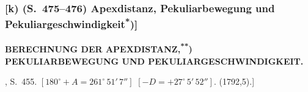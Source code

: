 \documentclass[12pt,a4paper]{article}
\theoremstyle{plain}
\theoremstyle{definition}
\theoremstyle{remark}
\begin{document}
\newpage
\subsubsection*{[k) (S.~475--476) Apexdistanz, Pekuliarbewegung und Pekuliargeschwindigkeit\textsuperscript{*})]}

\begin{center}
\textbf{BERECHNUNG DER APEXDISTANZ,\textsuperscript{**})}\\
\textbf{PEKULIARBEWEGUNG UND PEKULIARGESCHWINDIGKEIT.}
\end{center}

\begin{small}
[Bezeichnungen vgl.~[67 a], S.~455. $[180^{\circ} + A = 261^{\circ}\,51'\,7'']$
$[-D = +27^{\circ}\,5'\,52'']$. (1792,5).]
\end{small}
\end{document}
